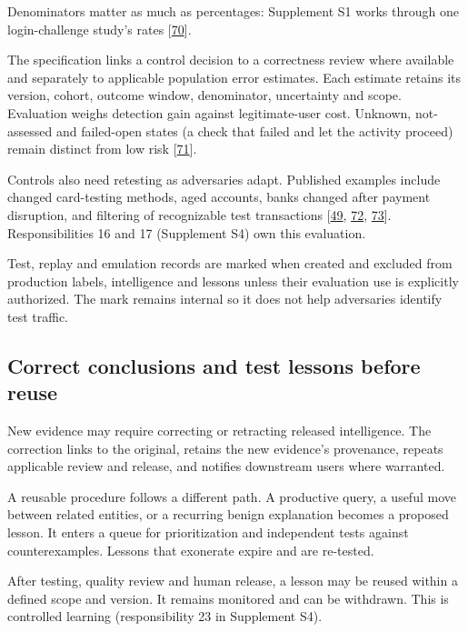 \documentclass[acmlarge,nonacm]{acmart}
\begin{document}
Denominators matter as much as percentages: Supplement S1 works through
one login-challenge study's rates
{[}\protect\hyperlink{ref-Doerfler2019}{70}{]}.

The specification links a control decision to a correctness review where
available and separately to applicable population error estimates. Each
estimate retains its version, cohort, outcome window, denominator,
uncertainty and scope. Evaluation weighs detection gain against
legitimate-user cost. Unknown, not-assessed and failed-open states (a
check that failed and let the activity proceed) remain distinct from low
risk {[}\protect\hyperlink{ref-Stripe2026PAYG}{71}{]}.

Controls also need retesting as adversaries adapt. Published examples
include changed card-testing methods, aged accounts, banks changed after
payment disruption, and filtering of recognizable test transactions
{[}\protect\hyperlink{ref-Thomas2013}{49},
\protect\hyperlink{ref-Meltzer2025}{72},
\protect\hyperlink{ref-Tian2018}{73}{]}. Responsibilities 16 and 17
(Supplement S4) own this evaluation.

Test, replay and emulation records are marked when created and excluded
from production labels, intelligence and lessons unless their evaluation
use is explicitly authorized. The mark remains internal so it does not
help adversaries identify test traffic.

\hypertarget{correct-conclusions-and-test-lessons-before-reuse}{%
\subsection{Correct conclusions and test lessons before
reuse}\label{correct-conclusions-and-test-lessons-before-reuse}}

New evidence may require correcting or retracting released intelligence.
The correction links to the original, retains the new evidence's
provenance, repeats applicable review and release, and notifies
downstream users where warranted.

A reusable procedure follows a different path. A productive query, a
useful move between related entities, or a recurring benign explanation
becomes a proposed lesson. It enters a queue for prioritization and
independent tests against counterexamples. Lessons that exonerate expire
and are re-tested.

After testing, quality review and human release, a lesson may be reused
within a defined scope and version. It remains monitored and can be
withdrawn. This is controlled learning (responsibility 23 in Supplement
S4).
\end{document}
